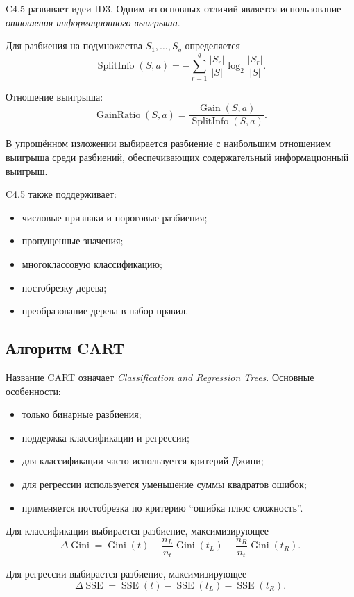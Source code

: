 \documentclass[12pt,a4paper]{article}
\theoremstyle{plain}
\theoremstyle{definition}
\theoremstyle{remark}
\newcommand{\Gain}{\operatorname{Gain}}
\newcommand{\Gini}{\operatorname{Gini}}
\begin{document}
C4.5 развивает идеи ID3. Одним из основных отличий является
использование \emph{отношения информационного выигрыша}.

Для разбиения на подмножества $S_1,\ldots,S_q$ определяется
\[
    \operatorname{SplitInfo}(S,a)
    =
    -
    \sum_{r=1}^{q}
    \frac{|S_r|}{|S|}
    \log_2\frac{|S_r|}{|S|}.
\]

Отношение выигрыша:
\[
    \operatorname{GainRatio}(S,a)
    =
    \frac{\Gain(S,a)}
         {\operatorname{SplitInfo}(S,a)}.
\]

В упрощённом изложении выбирается разбиение с наибольшим отношением
выигрыша среди разбиений, обеспечивающих содержательный информационный
выигрыш.

C4.5 также поддерживает:
\begin{itemize}
    \item числовые признаки и пороговые разбиения;
    \item пропущенные значения;
    \item многоклассовую классификацию;
    \item постобрезку дерева;
    \item преобразование дерева в набор правил.
\end{itemize}

\subsection{Алгоритм CART}

Название CART означает \emph{Classification and Regression Trees}.
Основные особенности:
\begin{itemize}
    \item только бинарные разбиения;
    \item поддержка классификации и регрессии;
    \item для классификации часто используется критерий Джини;
    \item для регрессии используется уменьшение суммы квадратов ошибок;
    \item применяется постобрезка по критерию ``ошибка плюс сложность''.
\end{itemize}

Для классификации выбирается разбиение, максимизирующее
\[
    \Delta\Gini
    =
    \Gini(t)
    -
    \frac{n_L}{n_t}\Gini(t_L)
    -
    \frac{n_R}{n_t}\Gini(t_R).
\]

Для регрессии выбирается разбиение, максимизирующее
\[
    \Delta\operatorname{SSE}
    =
    \operatorname{SSE}(t)
    -
    \operatorname{SSE}(t_L)
    -
    \operatorname{SSE}(t_R).
\]
\end{document}
